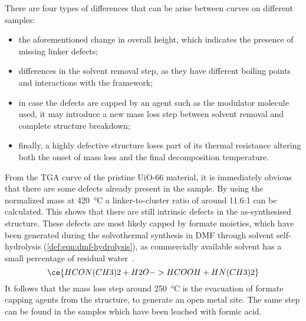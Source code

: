 There are four types of differences that can be arise 
between curves on different samples:

\begin{itemize}
    \item the aforementioned change in overall height,
    which indicates the presence of missing linker defects;
    \item differences in the solvent removal step, as they
    have different boiling points and interactions with the 
    framework;
    \item in case the defects are capped by an agent such as 
    the modulator molecule used, it may introduce a new 
    mass loss step between solvent removal and complete
    structure breakdown;
    \item finally, a highly defective structure loses part 
    of its thermal resistance altering both the onset of mass
    loss and the final decomposition temperature.
\end{itemize}

From the \gls{TGA} curve of the pristine UiO-66 material, 
it is immediately obvious that there are some defects 
already present in the sample. By using the normalized
mass at \SI{420}{\degreeCelsius} a linker-to-cluster 
ratio of around 11.6:1 can be calculated. This shows that
there are still intrinsic defects in the as-synthesised 
structure. These defects are most likely capped by 
formate moieties, which have been generated during 
the solvothermal synthesis in \gls{DMF} through solvent 
self-hydrolysis (\autoref{def:eqn:dmf-hydrolysis}), as 
commercially available solvent has a small percentage of 
residual water~\cite{shearerDefectEngineeringTuning2016}.
%
\begin{equation}\label{def:eqn:dmf-hydrolysis}
    \ce{HCON(CH3)2 + H2O -> HCOOH + HN(CH3)2}
\end{equation}
%
It follows that the mass loss step around \SI{250}{\degreeCelsius}
is the evacuation of formate capping agents from the 
structure, to generate an open metal site. The same step
can be found in the samples which have been leached with
formic acid.


